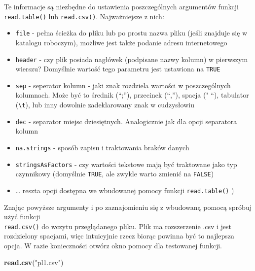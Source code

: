 \documentclass[]{book}
\newenvironment{Shaded}{\begin{snugshade}}{\end{snugshade}}
\newcommand{\KeywordTok}[1]{\textcolor[rgb]{0.13,0.29,0.53}{\textbf{#1}}}
\newcommand{\StringTok}[1]{\textcolor[rgb]{0.31,0.60,0.02}{#1}}
\newcommand{\NormalTok}[1]{#1}
\providecommand{\tightlist}{%
  \setlength{\itemsep}{0pt}\setlength{\parskip}{0pt}}
\theoremstyle{definition}
\theoremstyle{definition}
\theoremstyle{definition}
\theoremstyle{remark}
\begin{document}
Te informacje są niezbędne do ustawienia poszczególnych argumentów
funkcji \texttt{read.table()} lub \texttt{read.csv()}. Najważniejsze z
nich:

\begin{itemize}
\tightlist
\item
  \texttt{file} - pełna ścieżka do pliku lub po prostu nazwa pliku
  (jeśli znajduje się w katalogu roboczym), możliwe jest także podanie
  adresu internetowego
\item
  \texttt{header} - czy plik posiada nagłówek (podpisane nazwy kolumn) w
  pierwszym wierszu? Domyślnie wartość tego parametru jest ustawiona na
  \texttt{TRUE}
\item
  \texttt{sep} - seperator kolumn - jaki znak rozdziela wartości w
  poszczególnych kolumnach. Może być to średnik (``;''), przecinek
  (``,''), spacja (" ``), tabulator (\texttt{\textbackslash{}t}), lub
  inny dowolnie zadeklarowany znak w cudzysłowiu
\item
  \texttt{dec} - separator miejsc dziesiętnych. Analogicznie jak dla
  opcji separatora kolumn
\item
  \texttt{na.strings} - sposób zapisu i traktowania braków danych
\item
  \texttt{stringsAsFactors} - czy wartości tekstowe mają być traktowane
  jako typ czynnikowy (domyślnie \texttt{TRUE}, ale zwykle warto zmienić
  na \texttt{FALSE})
\item
  \ldots{} reszta opcji dostępna we wbudowanej pomocy funkcji
  \texttt{read.table()} )
\end{itemize}

Znając powyższe argumenty i po zaznajomieniu się z wbudowaną pomocą
spróbuj użyć funkcji\\
\texttt{read.csv()} do wczytu przeglądanego pliku. Plik ma rozszerzenie
.csv i jest rozdzielony spacjami, więc intuicyjnie rzecz biorąc powinna
być to najlepsza opcja. W razie konieczności otwórz okno pomocy dla
testowanej funkcji.

\begin{Shaded}
\begin{Highlighting}[]
\KeywordTok{read.csv}\NormalTok{(}\StringTok{"pl1.csv"}\NormalTok{)}
\end{Highlighting}
\end{Shaded}
\end{document}
